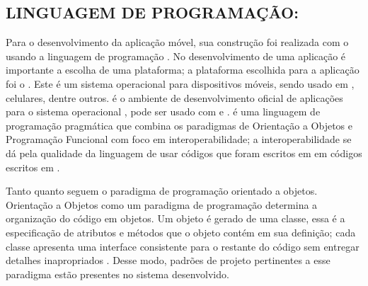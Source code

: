 
\subsection{LINGUAGEM DE PROGRAMAÇÃO: }

Para o desenvolvimento da aplicação móvel, sua construção foi realizada com o   usando a linguagem de programação . No desenvolvimento de uma aplicação é importante a escolha de uma plataforma; a plataforma escolhida para a aplicação foi o . Este é um sistema operacional para dispositivos móveis, sendo usado em , celulares, dentre outros.  é o ambiente de desenvolvimento oficial de aplicações para o sistema operacional , pode ser usado com   e .  é uma linguagem de programação pragmática que combina os paradigmas de Orientação a Objetos e Programação Funcional com foco em interoperabilidade; a interoperabilidade se dá pela qualidade da linguagem de usar códigos que foram escritos em  em códigos escritos em  \cite{Resende2020KotlinAndroid}. 

Tanto  quanto  seguem o paradigma de programação orientado a objetos. Orientação a Objetos como um paradigma de programação determina a organização do código em objetos. Um objeto é gerado de uma classe, essa é a especificação de atributos e métodos que o objeto contém em sua definição; cada classe apresenta uma interface consistente para o restante do código sem entregar detalhes inapropriados \cite{GoodrichTamassiaMount2011DataStructuresCpp}. Desse modo, padrões de projeto pertinentes a esse paradigma estão presentes no sistema desenvolvido.
